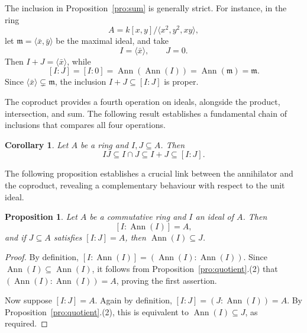 \documentclass{amsart}
\newtheorem{proposition}{Proposition}
\newtheorem{corollary}{Corollary}
\DeclareMathOperator{\ann}{Ann}
\begin{document}
The inclusion in Proposition~\ref{pro:sum} is generally strict. For instance, in the ring
\[
A=k[x,y]/\langle x^2,y^2,xy\rangle,
\]
let $\mathfrak m=\langle \bar{x},\bar{y}\rangle$ be the maximal ideal, and take
\[
I=\langle \bar{x}\rangle,\qquad J=0.
\]
Then $I+J=\langle \bar{x}\rangle$, while
\[
[I:J]=[I:0]=\ann(\ann(I))=\ann(\mathfrak m)=\mathfrak m.
\]
Since $\langle \bar{x}\rangle\subsetneq \mathfrak m$, the inclusion $I+J\subseteq [I:J]$ is proper.

The coproduct provides a fourth operation on ideals, alongside the product, intersection, and sum. The following result establishes a fundamental chain of inclusions that compares all four operations.

\begin{corollary}\label{cor:order}
Let $A$ be a ring and $I,J\subseteq A$. Then
\[
IJ \subseteq I\cap J \subseteq I+J \subseteq [I:J].
\]
\end{corollary}

The following proposition establishes a crucial link between the annihilator and the coproduct, revealing a complementary behaviour with respect to the unit ideal.

\begin{proposition}\label{prop:coproduct-annihilator}
Let $A$ be a commutative ring and $I$ an ideal of $A$. Then
\[
[I:\ann(I)] = A,
\]
and if $J \subseteq A$ satisfies $[I:J] = A$, then $\ann(I) \subseteq J$.
\end{proposition}

\begin{proof}
By definition, $[I:\ann(I)] = (\ann(I):\ann(I))$. Since $\ann(I) \subseteq \ann(I)$, it follows from Proposition~\ref{pro:quotient}.(2) that $(\ann(I):\ann(I)) = A$, proving the first assertion.

Now suppose $[I:J] = A$. Again by definition, $[I:J] = (J:\ann(I)) = A$. By Proposition~\ref{pro:quotient}.(2), this is equivalent to $\ann(I) \subseteq J$, as required.
\end{proof}
\end{document}
